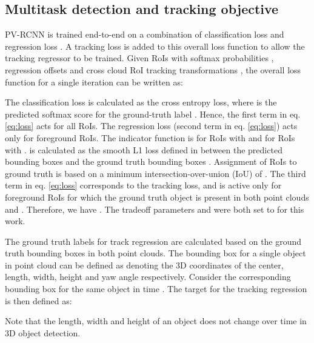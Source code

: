 \documentclass[10pt,twocolumn,letterpaper]{article}
\begin{document}
\subsection{Multitask detection and tracking objective}\label{sec:method:multi_loss}
PV-RCNN \cite{Shi_2020_CVPR} is trained end-to-end on a combination of classification loss  and regression loss . A tracking loss  is added to this overall loss function to allow the tracking regressor to be trained. Given  RoIs with softmax probabilities , regression offsets  and cross cloud RoI tracking transformations , the overall loss function for a single iteration can be written as:


The classification loss is calculated as the cross entropy loss,  where  is the predicted softmax score for the ground-truth label . Hence, the first term in eq. \ref{eq:loss} acts for all  RoIs. The regression loss (second term in eq. \ref{eq:loss}) acts only for  foreground RoIs. The indicator function  is  for RoIs with  and  for RoIs with .  is calculated as the smooth L1 loss defined in \cite{Girshick2015} between the predicted bounding boxes  and the ground truth bounding boxes . Assignment of RoIs to ground truth is based on a minimum intersection-over-union (IoU) of . The third term in eq. \ref{eq:loss} corresponds to the tracking loss, and is active only for foreground RoIs for which the ground truth object is present in both point clouds  and . Therefore, we have . The tradeoff parameters  and  were both set to  for this work.

The ground truth labels for track regression are calculated based on the ground truth bounding boxes in both point clouds. The bounding box for a single object in point cloud  can be defined as  denoting the 3D coordinates of the center, length, width, height and yaw angle respectively. Consider the corresponding bounding box  for the same object in time . The target for the tracking regression  is then defined as:

Note that the length, width and height of an object does not change over time in 3D object detection.
\end{document}
